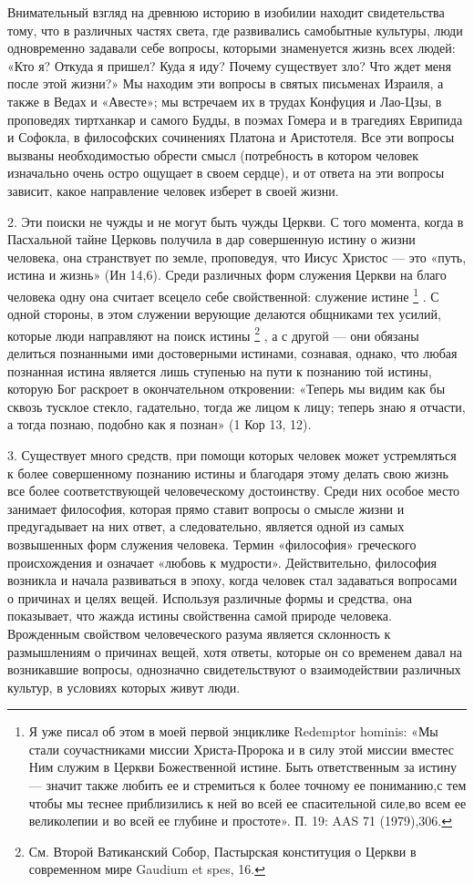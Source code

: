 \documentclass[a5paper,10pt]{article}
\begin{document}
Внимательный взгляд на древнюю историю в изобилии находит свидетельства тому,
что в различных частях света, где развивались самобытные культуры, люди
одновременно задавали себе вопросы, которыми знаменуется жизнь всех людей: «Кто
я? Откуда я пришел? Куда я иду? Почему существует зло? Что ждет меня после этой
жизни?» Мы находим эти вопросы в святых письменах Израиля, а также в Ведах и
«Авесте»; мы встречаем их в трудах Конфуция и Лао-Цзы, в проповедях тиртханкар
и самого Будды, в поэмах Гомера и в трагедиях Еврипида и Софокла, в философских
сочинениях Платона и Аристотеля. Все эти вопросы вызваны необходимостью обрести
смысл (потребность в котором человек изначально очень остро ощущает в своем
сердце), и от ответа на эти вопросы зависит, какое направление человек изберет
в своей жизни.

2. Эти поиски не чужды и не могут быть чужды Церкви. С того момента, когда в
Пасхальной тайне Церковь получила в дар совершенную истину о жизни человека,
она странствует по земле, проповедуя, что Иисус Христос — это «путь, истина и
жизнь» (Ин 14,6). Среди различных форм служения Церкви на благо человека одну
она считает всецело себе свойственной: служение истине \footnote{Я уже писал об
    этом в моей первой энциклике Redemptor hominis: «Мы стали соучастниками
    миссии Христа-Пророка и в силу этой миссии вместес Ним служим в Церкви
    Божественной истине. Быть ответственным за истину — значит также любить ее
    и стремиться к более точному ее пониманию,с тем чтобы мы теснее
    приблизились к ней во всей ее спасительной силе,во всем ее великолепии и во
всей ее глубине и простоте». П. 19: AAS 71 (1979),306.} . С одной стороны, в
этом служении верующие делаются общниками тех усилий, которые люди направляют
на поиск истины \footnote{См. Второй Ватиканский Собор, Пастырская конституция
о Церкви в современном мире Gaudium et spes, 16.} , а с другой — они обязаны
делиться познанными ими достоверными истинами, сознавая, однако, что любая
познанная истина является лишь ступенью на пути к познанию той истины, которую
Бог раскроет в окончательном откровении: «Теперь мы видим как бы сквозь тусклое
стекло, гадательно, тогда же лицом к лицу; теперь знаю я отчасти, а тогда
познаю, подобно как я познан» (1 Кор 13, 12).

3. Существует много средств, при помощи которых человек может устремляться к
более совершенному познанию истины и благодаря этому делать свою жизнь все
более соответствующей человеческому достоинству. Среди них особое место
занимает философия, которая прямо ставит вопросы о смысле жизни и предугадывает
на них ответ, а следовательно, является одной из самых возвышенных форм
служения человека. Термин «философия» греческого происхождения и означает
«любовь к мудрости». Действительно, философия возникла и начала развиваться в
эпоху, когда человек стал задаваться вопросами о причинах и целях вещей.
Используя различные формы и средства, она показывает, что жажда истины
свойственна самой природе человека. Врожденным свойством человеческого разума
является склонность к размышлениям о причинах вещей, хотя ответы, которые он со
временем давал на возникавшие вопросы, однозначно свидетельствуют о
взаимодействии различных культур, в условиях которых живут люди.
\end{document}
